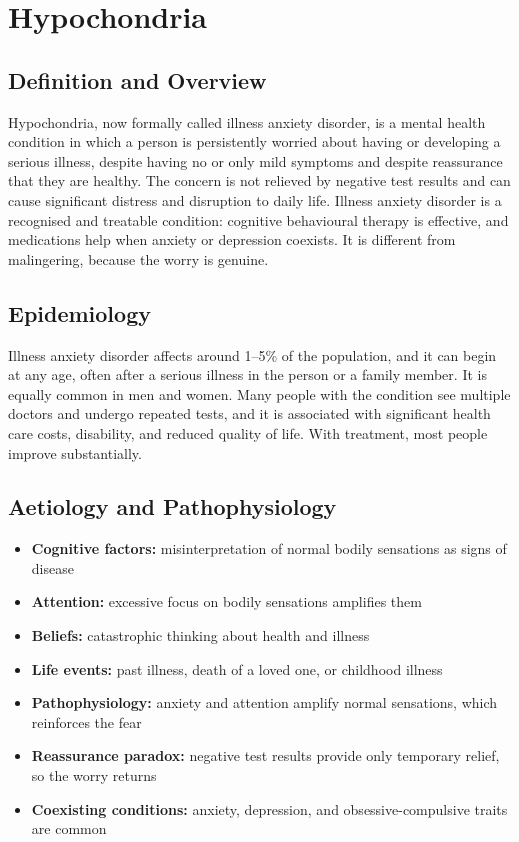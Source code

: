 \chapter{Hypochondria}

\section*{Definition and Overview}
Hypochondria, now formally called illness anxiety disorder, is a mental health condition in which a person is persistently worried about having or developing a serious illness, despite having no or only mild symptoms and despite reassurance that they are healthy. The concern is not relieved by negative test results and can cause significant distress and disruption to daily life. Illness anxiety disorder is a recognised and treatable condition: cognitive behavioural therapy is effective, and medications help when anxiety or depression coexists. It is different from malingering, because the worry is genuine.

\section*{Epidemiology}
Illness anxiety disorder affects around 1--5\% of the population, and it can begin at any age, often after a serious illness in the person or a family member. It is equally common in men and women. Many people with the condition see multiple doctors and undergo repeated tests, and it is associated with significant health care costs, disability, and reduced quality of life. With treatment, most people improve substantially.

\section*{Aetiology and Pathophysiology}
\begin{itemize}
    \item \textbf{Cognitive factors:} misinterpretation of normal bodily sensations as signs of disease
    \item \textbf{Attention:} excessive focus on bodily sensations amplifies them
    \item \textbf{Beliefs:} catastrophic thinking about health and illness
    \item \textbf{Life events:} past illness, death of a loved one, or childhood illness
    \item \textbf{Pathophysiology:} anxiety and attention amplify normal sensations, which reinforces the fear
    \item \textbf{Reassurance paradox:} negative test results provide only temporary relief, so the worry returns
    \item \textbf{Coexisting conditions:} anxiety, depression, and obsessive-compulsive traits are common
\end{itemize}

